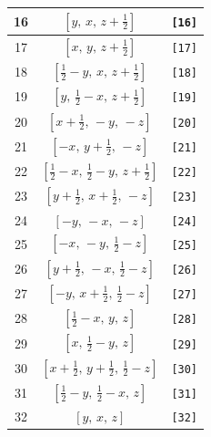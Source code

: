 \documentclass[fleqn,8pt]{jsarticle}
\begin{document}
\begin{longtable}{ccc}
16 & $\left[ y,\, x,\, z + \frac{1}{2} \right]$ & {\tt [16]} \\ \hline
17 & $\left[ x,\, y,\, z + \frac{1}{2} \right]$ & {\tt [17]} \\ \hline
18 & $\left[ \frac{1}{2} - y,\, x,\, z + \frac{1}{2} \right]$ & {\tt [18]} \\ \hline
19 & $\left[ y,\, \frac{1}{2} - x,\, z + \frac{1}{2} \right]$ & {\tt [19]} \\ \hline
20 & $\left[ x + \frac{1}{2},\, - y,\, - z \right]$ & {\tt [20]} \\ \hline
21 & $\left[ - x,\, y + \frac{1}{2},\, - z \right]$ & {\tt [21]} \\ \hline
22 & $\left[ \frac{1}{2} - x,\, \frac{1}{2} - y,\, z + \frac{1}{2} \right]$ & {\tt [22]} \\ \hline
23 & $\left[ y + \frac{1}{2},\, x + \frac{1}{2},\, - z \right]$ & {\tt [23]} \\ \hline
24 & $\left[ - y,\, - x,\, - z \right]$ & {\tt [24]} \\ \hline
25 & $\left[ - x,\, - y,\, \frac{1}{2} - z \right]$ & {\tt [25]} \\ \hline
26 & $\left[ y + \frac{1}{2},\, - x,\, \frac{1}{2} - z \right]$ & {\tt [26]} \\ \hline
27 & $\left[ - y,\, x + \frac{1}{2},\, \frac{1}{2} - z \right]$ & {\tt [27]} \\ \hline
28 & $\left[ \frac{1}{2} - x,\, y,\, z \right]$ & {\tt [28]} \\ \hline
29 & $\left[ x,\, \frac{1}{2} - y,\, z \right]$ & {\tt [29]} \\ \hline
30 & $\left[ x + \frac{1}{2},\, y + \frac{1}{2},\, \frac{1}{2} - z \right]$ & {\tt [30]} \\ \hline
31 & $\left[ \frac{1}{2} - y,\, \frac{1}{2} - x,\, z \right]$ & {\tt [31]} \\ \hline
32 & $\left[ y,\, x,\, z \right]$ & {\tt [32]} \\
\end{longtable}
\end{document}
